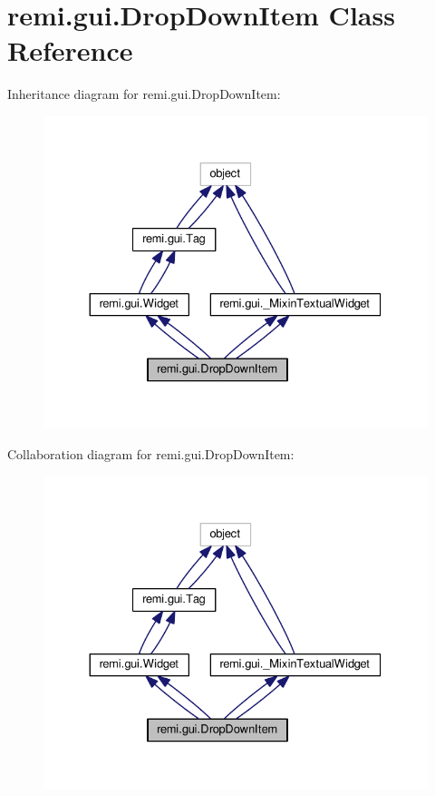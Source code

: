 \hypertarget{classremi_1_1gui_1_1DropDownItem}{}\section{remi.\+gui.\+Drop\+Down\+Item Class Reference}
\label{classremi_1_1gui_1_1DropDownItem}


Inheritance diagram for remi.\+gui.\+Drop\+Down\+Item\+:
\nopagebreak
\begin{figure}[H]
\begin{center}
\leavevmode
\includegraphics[width=330pt]{d4/d5c/classremi_1_1gui_1_1DropDownItem__inherit__graph}
\end{center}
\end{figure}


Collaboration diagram for remi.\+gui.\+Drop\+Down\+Item\+:
\nopagebreak
\begin{figure}[H]
\begin{center}
\leavevmode
\includegraphics[width=330pt]{d1/da8/classremi_1_1gui_1_1DropDownItem__coll__graph}
\end{center}
\end{figure}
